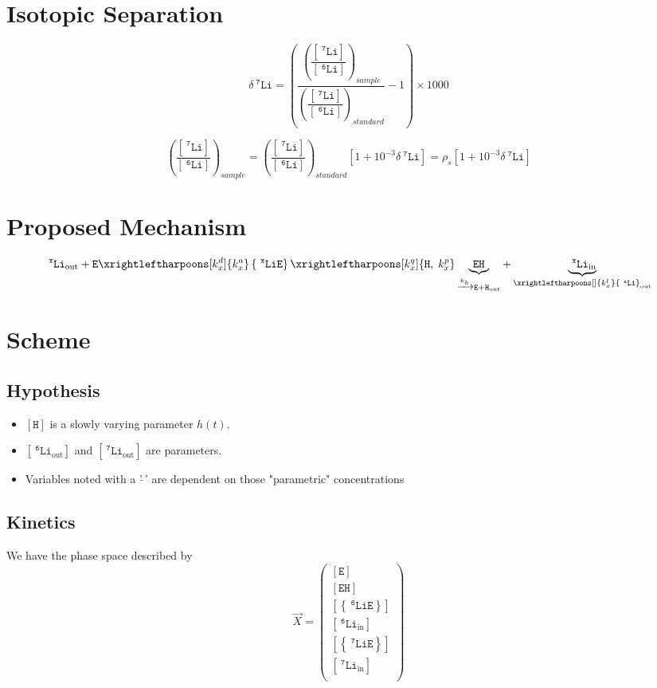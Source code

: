 \documentclass[aps,onecolumn,12pt]{revtex4}
\newcommand{\mychem}[1]{\mathtt{#1}}
\newcommand{\myconc}[1]{\left\lbrack{#1}\right\rbrack}
\newcommand{\spLi}[1]{{~^{\mychem{#1}}\mychem{Li}}}
\newcommand{\Li}[1]{\myconc{\spLi{#1}}}
\newcommand{\spEout}{\mychem{E}}
\newcommand{\Eout}{\myconc{\spEout}}
\newcommand{\spLiE}[1]{\left\lbrace\spLi{#1}\spEout\right\rbrace}
\newcommand{\LiE}[1]{\myconc{\spLiE{#1}}}
\newcommand{\spLiIn}[1]{{\spLi{#1}}_{\mathrm{in}}}
\newcommand{\LiIn}[1]{\myconc{\spLiIn{#1}}}
\newcommand{\spLiOut}[1]{{\spLi{#1}}_{\mathrm{out}}}
\newcommand{\LiOut}[1]{\myconc{\spLiOut{#1}}}
\newcommand{\spEHin}{\mychem{EH}}
\newcommand{\EHin}{\myconc{\spEHin}}
\newcommand{\spproton}{\mychem{H}}
\newcommand{\proton}{\myconc{\spproton}}
\newcommand{\deltaLi}{ {\delta\!\!\!\spLi{7}} }
\begin{document}
\section{Isotopic Separation}
$$
	\deltaLi = \left(
		\dfrac{\left(\dfrac{\Li{7}}{\Li{6}}\right)_{sample}}
		{\left(\dfrac{\Li{7}}{\Li{6}}\right)_{standard}}
		 -1 
	\right) \times 1000
$$

$$
	\left(\dfrac{\Li{7}}{\Li{6}}\right)_{sample} = \left(\dfrac{\Li{7}}{\Li{6}}\right)_{standard} \left[1+10^{-3}\deltaLi\right] = \rho_s \left[1+10^{-3}\deltaLi\right]
$$


\section{Proposed Mechanism}

\begin{equation}
	 \spLiOut{x} +  \spEout  
	 \xrightleftharpoons[k_x^d]{k_x^a} 
	 \spLiE{x}
	  \xrightleftharpoons[k_x^q]{\mychem{H},\;k_x^p} \underbrace{\spEHin}_{\xrightarrow[]{k_h} \mychem{E} + \mychem{H}_{\mathrm{out}}} + \underbrace{\spLiIn{x}}_{\xrightleftharpoons[]{k_x^l} \spLiOut{x}}
\end{equation}

\section{Scheme}

\subsection{Hypothesis}
\begin{itemize}
\item $\proton$ is a slowly varying parameter $h(t)$.
\item $\LiOut{6}$ and  $\LiOut{7}$ are parameters.
\item Variables noted with a '$\tilde{~}$' are dependent on those "parametric" concentrations
\end{itemize}

\subsection{Kinetics}
We have the phase space described by
\begin{equation}
 \vec{X} = 
        \begin{pmatrix}
        \Eout\\
        \EHin\\
        \LiE{6}\\
        \LiIn{6}\\
        \LiE{7}\\
        \LiIn{7}\\
        \end{pmatrix}
\end{equation}
\end{document}
